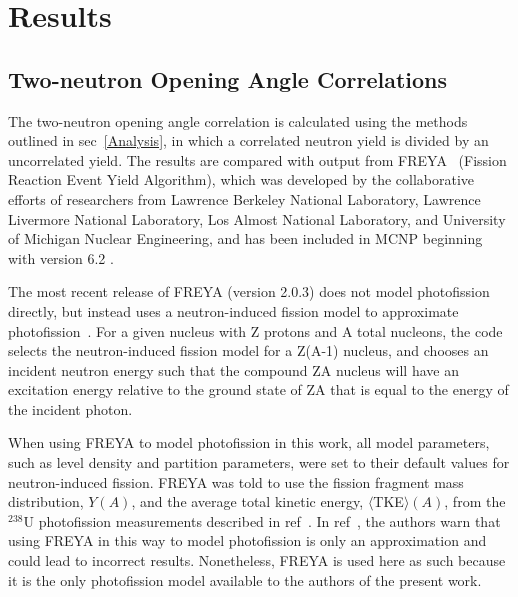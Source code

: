 \chapter{Results}
\section{Two-neutron Opening Angle Correlations}
The two-neutron opening angle correlation is calculated using the methods outlined in sec~\ref{Analysis}, in which a correlated neutron yield is divided by an uncorrelated yield.
The results are compared with output from FREYA~\cite{FREYA} (Fission Reaction Event Yield Algorithm), which was developed by the collaborative efforts of researchers from Lawrence Berkeley National Laboratory,  Lawrence Livermore National Laboratory, Los Almost National Laboratory, and University of Michigan Nuclear Engineering, and has been included in MCNP beginning with version 6.2 .
 
The most recent release of FREYA (version 2.0.3) does not model photofission directly, but instead uses a neutron-induced fission model to approximate photofission~\cite{FREYA_photofission}.
For a given nucleus with Z protons and A total nucleons, the code selects the neutron-induced fission model for a Z(A-1) nucleus, and chooses an incident neutron energy such that the compound ZA nucleus will have an excitation energy relative to the ground state of ZA that is equal to the energy of the incident photon.

When using FREYA to model photofission in this work, all model parameters, such as level density and partition parameters, were set to their default values for neutron-induced fission.
FREYA was told to use the fission fragment mass distribution, $Y(A)$, and the average total kinetic energy, $\langle$TKE$\rangle(A)$, from the $^{238}$U photofission measurements described in ref~\cite{2017Krishichayan}.
In ref~\cite{Talou2018}, the authors warn that using FREYA in this way to model photofission is only an approximation and could lead to incorrect results.
Nonetheless, FREYA is used here as such because it is the only photofission model available to the authors of the present work.

